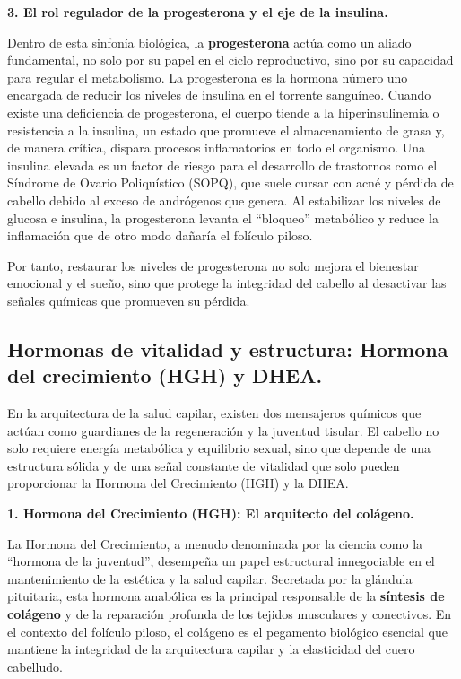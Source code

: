 \documentclass[
  spanish,
]{article}
\begin{document}
\textbf{3. El rol regulador de la progesterona y el eje de la insulina.}

Dentro de esta sinfonía biológica, la \textbf{progesterona} actúa como un aliado fundamental, no solo por su papel en el ciclo reproductivo, sino por su capacidad para regular el metabolismo. La progesterona es la hormona número uno encargada de reducir los niveles de insulina en el torrente sanguíneo. Cuando existe una deficiencia de progesterona, el cuerpo tiende a la hiperinsulinemia o resistencia a la insulina, un estado que promueve el almacenamiento de grasa y, de manera crítica, dispara procesos inflamatorios en todo el organismo.
Una insulina elevada es un factor de riesgo para el desarrollo de trastornos como el Síndrome de Ovario Poliquístico (SOPQ), que suele cursar con acné y pérdida de cabello debido al exceso de andrógenos que genera. Al estabilizar los niveles de glucosa e insulina, la progesterona levanta el ``bloqueo'' metabólico y reduce la inflamación que de otro modo dañaría el folículo piloso.

Por tanto, restaurar los niveles de progesterona no solo mejora el bienestar emocional y el sueño, sino que protege la integridad del cabello al desactivar las señales químicas que promueven su pérdida.

\subsection{Hormonas de vitalidad y estructura: Hormona del crecimiento (HGH) y DHEA.}\label{hormonas-de-vitalidad-y-estructura-hormona-del-crecimiento-hgh-y-dhea.}

En la arquitectura de la salud capilar, existen dos mensajeros químicos que actúan como guardianes de la regeneración y la juventud tisular. El cabello no solo requiere energía metabólica y equilibrio sexual, sino que depende de una estructura sólida y de una señal constante de vitalidad que solo pueden proporcionar la Hormona del Crecimiento (HGH) y la DHEA.

\textbf{1. Hormona del Crecimiento (HGH): El arquitecto del colágeno.}

La Hormona del Crecimiento, a menudo denominada por la ciencia como la ``hormona de la juventud'', desempeña un papel estructural innegociable en el mantenimiento de la estética y la salud capilar. Secretada por la glándula pituitaria, esta hormona anabólica es la principal responsable de la \textbf{síntesis de colágeno} y de la reparación profunda de los tejidos musculares y conectivos. En el contexto del folículo piloso, el colágeno es el pegamento biológico esencial que mantiene la integridad de la arquitectura capilar y la elasticidad del cuero cabelludo.
\end{document}
